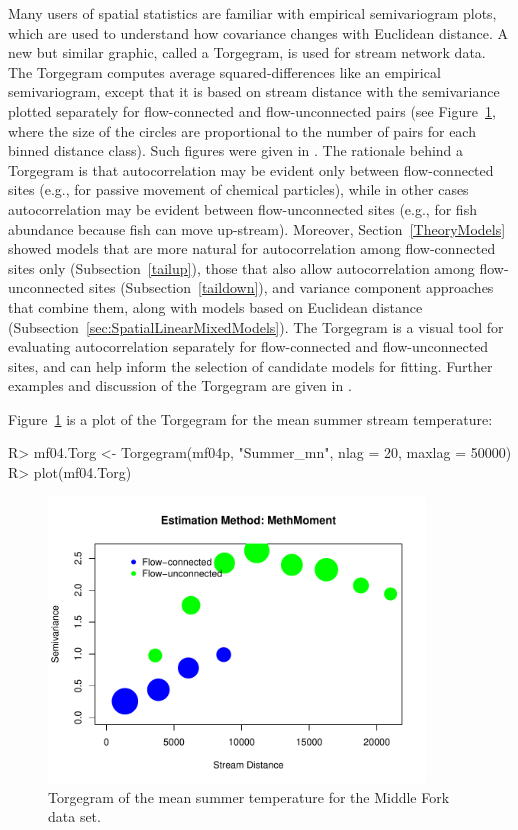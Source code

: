 \documentclass[nojss]{jss}
\renewenvironment{Schunk}{\vspace{\topsep}}{\vspace{\topsep}}
\begin{document}
Many users of spatial statistics are familiar with empirical semivariogram plots, which are used to understand how covariance changes with Euclidean distance. A new but similar graphic, called a Torgegram, is used for stream network data. The Torgegram computes average squared-differences like an empirical semivariogram, except that it is based on stream distance with the semivariance plotted separately for flow-connected and flow-unconnected pairs (see Figure~\ref{Torgegram}, where the size of the circles are proportional to the number of pairs for each binned distance class). Such figures were given in \citep{Ver:Pete:Theo:spat:2006, Ver:Pete:Move:2010}. The rationale behind a Torgegram is that autocorrelation may be evident only between flow-connected sites (e.g., for passive movement of chemical particles), while in other cases autocorrelation may be evident between flow-unconnected sites (e.g., for fish abundance because fish can move up-stream). Moreover, Section~\ref{TheoryModels} showed models that are more natural for autocorrelation among flow-connected sites only (Subsection~\ref{tailup}), those that also allow autocorrelation among flow-unconnected sites (Subsection~\ref{taildown}), and variance component approaches that combine them, along with models based on Euclidean distance (Subsection~\ref{sec:SpatialLinearMixedModels}).  The Torgegram is a visual tool for evaluating autocorrelation separately for flow-connected and flow-unconnected sites, and can help inform the selection of candidate models for fitting.  Further examples and discussion of the Torgegram are given in \citet{Pete:Ver:Isaa:stre:2013}.

Figure~\ref{Torgegram} is a plot of the Torgegram for the mean summer stream temperature:

\begin{Schunk}
\begin{Sinput}
R> mf04.Torg <- Torgegram(mf04p, "Summer_mn", nlag = 20, maxlag = 50000)
R> plot(mf04.Torg)
\end{Sinput}
\end{Schunk}

\begin{figure}[htbp]
  \begin{center}
    \includegraphics[keepaspectratio=true, width = 100mm]{Figures/jss984Fig-Torgegram}
    \caption{Torgegram of the mean summer temperature for the Middle
      Fork data set.\label{Torgegram}}
  \end{center}
\end{figure}
\end{document}
